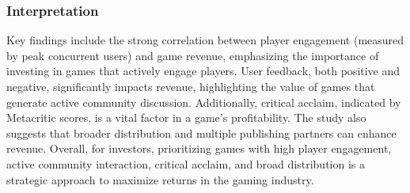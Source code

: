 \documentclass[
]{article}
\begin{document}
\hypertarget{interpretation-1}{%
\subsubsection{Interpretation}\label{interpretation-1}}

Key findings include the strong correlation between player engagement
(measured by peak concurrent users) and game revenue, emphasizing the
importance of investing in games that actively engage players. User
feedback, both positive and negative, significantly impacts revenue,
highlighting the value of games that generate active community
discussion. Additionally, critical acclaim, indicated by Metacritic
scores, is a vital factor in a game's profitability. The study also
suggests that broader distribution and multiple publishing partners can
enhance revenue. Overall, for investors, prioritizing games with high
player engagement, active community interaction, critical acclaim, and
broad distribution is a strategic approach to maximize returns in the
gaming industry.
\end{document}

